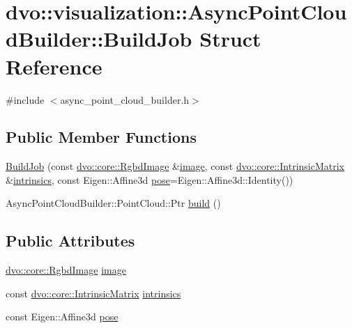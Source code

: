 \hypertarget{structdvo_1_1visualization_1_1_async_point_cloud_builder_1_1_build_job}{}\section{dvo\+:\+:visualization\+:\+:Async\+Point\+Cloud\+Builder\+:\+:Build\+Job Struct Reference}
\label{structdvo_1_1visualization_1_1_async_point_cloud_builder_1_1_build_job}


{\ttfamily \#include $<$async\+\_\+point\+\_\+cloud\+\_\+builder.\+h$>$}

\subsection*{Public Member Functions}
\begin{DoxyCompactItemize}
\item 
\mbox{\hyperlink{structdvo_1_1visualization_1_1_async_point_cloud_builder_1_1_build_job_aec73b6b369dcca8f963192af75c3a47e}{Build\+Job}} (const \mbox{\hyperlink{structdvo_1_1core_1_1_rgbd_image}{dvo\+::core\+::\+Rgbd\+Image}} \&\mbox{\hyperlink{structdvo_1_1visualization_1_1_async_point_cloud_builder_1_1_build_job_a72ca6499e953f81647aa4f3bf784f3be}{image}}, const \mbox{\hyperlink{structdvo_1_1core_1_1_intrinsic_matrix}{dvo\+::core\+::\+Intrinsic\+Matrix}} \&\mbox{\hyperlink{structdvo_1_1visualization_1_1_async_point_cloud_builder_1_1_build_job_a49c37651ffed4860b90907836cc0e362}{intrinsics}}, const Eigen\+::\+Affine3d \mbox{\hyperlink{structdvo_1_1visualization_1_1_async_point_cloud_builder_1_1_build_job_a8a72a1adf7299f22ee95e14e608ad332}{pose}}=Eigen\+::\+Affine3d\+::\+Identity())
\item 
Async\+Point\+Cloud\+Builder\+::\+Point\+Cloud\+::\+Ptr \mbox{\hyperlink{structdvo_1_1visualization_1_1_async_point_cloud_builder_1_1_build_job_a0bd1cdd7ef431814573eac7d0af60f93}{build}} ()
\end{DoxyCompactItemize}
\subsection*{Public Attributes}
\begin{DoxyCompactItemize}
\item 
\mbox{\hyperlink{structdvo_1_1core_1_1_rgbd_image}{dvo\+::core\+::\+Rgbd\+Image}} \mbox{\hyperlink{structdvo_1_1visualization_1_1_async_point_cloud_builder_1_1_build_job_a72ca6499e953f81647aa4f3bf784f3be}{image}}
\item 
const \mbox{\hyperlink{structdvo_1_1core_1_1_intrinsic_matrix}{dvo\+::core\+::\+Intrinsic\+Matrix}} \mbox{\hyperlink{structdvo_1_1visualization_1_1_async_point_cloud_builder_1_1_build_job_a49c37651ffed4860b90907836cc0e362}{intrinsics}}
\item 
const Eigen\+::\+Affine3d \mbox{\hyperlink{structdvo_1_1visualization_1_1_async_point_cloud_builder_1_1_build_job_a8a72a1adf7299f22ee95e14e608ad332}{pose}}
\end{DoxyCompactItemize}



